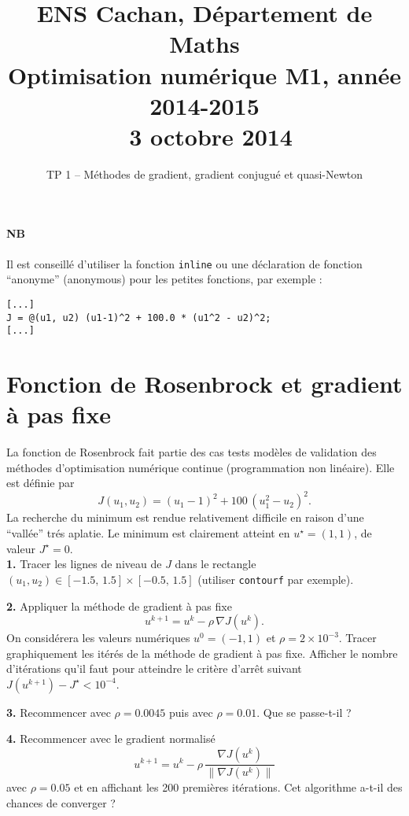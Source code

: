 \documentclass[11pt, a4paper]{amsart}
\title{ENS Cachan, Département de Maths \\ [1cm]
Optimisation numérique M1, année 2014-2015\\
\scriptsize{~3 octobre 2014}}
\author{TP 1 -- Méthodes de gradient, gradient conjugué et quasi-Newton}
\date{}
\begin{document}
%
\maketitle
%
\paragraph{NB} Il est conseillé d'utiliser la fonction \texttt{inline} ou une déclaration de fonction ``anonyme'' (anonymous) pour les petites 
fonctions, par exemple :

\begin{verbatim}
[...]
J = @(u1, u2) (u1-1)^2 + 100.0 * (u1^2 - u2)^2;
[...]
\end{verbatim}
%
\section{Fonction de Rosenbrock et gradient à pas fixe}
%
La fonction de Rosenbrock fait partie des cas tests modèles de validation
des méthodes d'optimisation numérique continue (programmation
non linéaire). Elle est définie par
\[
J(u_1,u_2) = (u_1-1)^2 + 100\, (u_1^2-u_2)^2.
\]
La recherche du minimum est rendue relativement difficile en raison
d'une ``vallée'' trés aplatie. Le minimum est clairement atteint en $u^\star=(1,1)$, de valeur $J^\star=0$. \\

\textbf{1.} Tracer les lignes de niveau de $J$ dans le rectangle 
$(u_1,u_2)\in [-1.5,\,1.5]\times[-0.5,\, 1.5]$ (utiliser \texttt{contourf} par
exemple).

\textbf{2.} Appliquer la méthode de gradient à pas fixe 
\[
u^{k+1} = u^k - \rho \, \nabla J(u^k).
\] 
On considérera les valeurs numériques $u^0=(-1,1)$ et $\rho=2\times 10^{-3}$.
Tracer graphiquement les itérés de la méthode de gradient à pas fixe.
Afficher le nombre d'itérations qu'il faut pour atteindre le critère
d'arrêt suivant $J(u^{k+1})-J^\star < 10^{-4}$.

\textbf{3.} Recommencer avec $\rho=0.0045$ puis avec $\rho=0.01$. Que se passe-t-il ?

\textbf{4.} Recommencer avec le gradient normalisé
\[
u^{k+1} = u^k - \rho \, \frac{\nabla J(u^k)}{\|\nabla J(u^k)\|}
\]
avec $\rho = 0.05$ et en affichant les 200 premières itérations. 
Cet algorithme a-t-il des chances de converger ?
%
%
\end{document}
